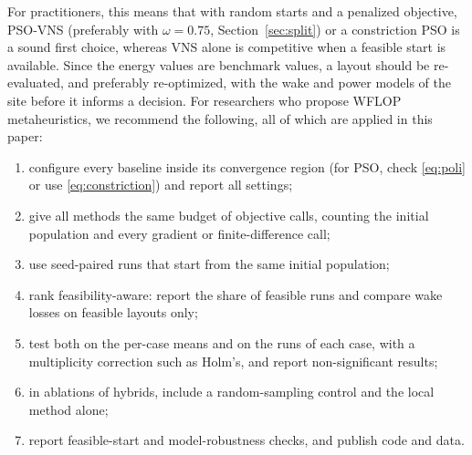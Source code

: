 For practitioners, this means that with random starts and a penalized objective, PSO-VNS (preferably with $\omega=0.75$, Section~\ref{sec:split}) or a constriction PSO is a sound first choice, whereas VNS alone is competitive when a feasible start is available. Since the energy values are benchmark values, a layout should be re-evaluated, and preferably re-optimized, with the wake and power models of the site before it informs a decision. For researchers who propose WFLOP metaheuristics, we recommend the following, all of which are applied in this paper:
\begin{enumerate}
\item configure every baseline inside its convergence region (for PSO, check \eqref{eq:poli} or use \eqref{eq:constriction}) and report all settings;
\item give all methods the same budget of objective calls, counting the initial population and every gradient or finite-difference call;
\item use seed-paired runs that start from the same initial population;
\item rank feasibility-aware: report the share of feasible runs and compare wake losses on feasible layouts only;
\item test both on the per-case means and on the runs of each case, with a multiplicity correction such as Holm's, and report non-significant results;
\item in ablations of hybrids, include a random-sampling control and the local method alone;
\item report feasible-start and model-robustness checks, and publish code and data.
\end{enumerate}


